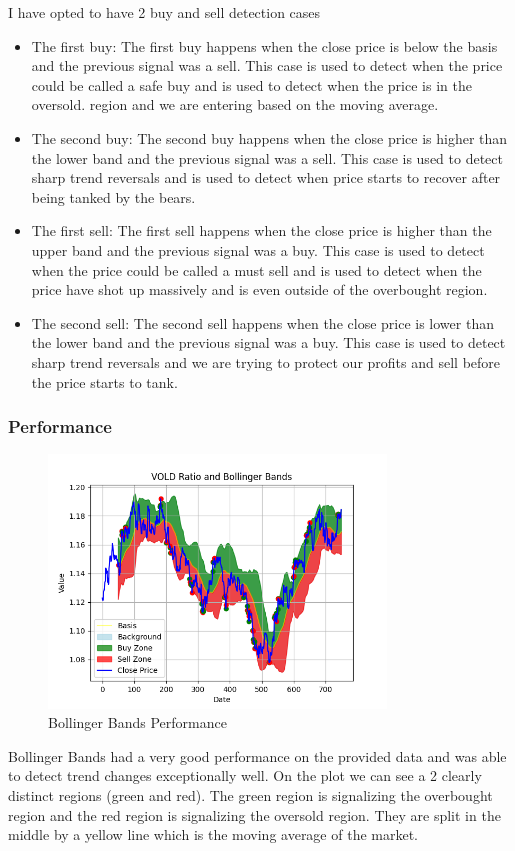 \documentclass{imc-inf}
\begin{document}
				I have opted to have 2 buy and sell detection cases
				\begin{itemize}
					\item The first buy: The first buy happens when the close price is below the basis and the previous signal was a sell.
						\subitem This case is used to detect when the price could be called a safe buy and is used to detect when the price is in the oversold.
						region and we are entering based on the moving average.
					\item The second buy: The second buy happens when the close price is higher than the lower band and the previous signal was a sell. 
						\subitem This case is used to detect sharp trend reversals and is used to detect when price starts to recover after being tanked by the bears. 
					\item The first sell: The first sell happens when the close price is higher than the upper band and the previous signal was a buy.
						\subitem This case is used to detect when the price could be called a must sell and is used to detect when the price have shot up massively and 
						is even outside of the overbought region.
					\item The second sell: The second sell happens when the close price is lower than the lower band and the previous signal was a buy.
						\subitem This case is used to detect sharp trend reversals and we are trying to protect our profits and sell before the price starts to tank.
				\end{itemize}

			\subsubsection{Performance}
				\begin{figure}[h!]
					\centering
					\includegraphics[width=0.8\textwidth]{bollinger_bands_plot.png}
					\caption{Bollinger Bands Performance}
					\label{fig:bollinger_bands_performance}
				\end{figure}
				Bollinger Bands had a very good performance on the provided data and was able to detect trend changes exceptionally well. 
				On the plot we can see a 2 clearly distinct regions (green and red). The green region is signalizing the overbought region and the red
				region is signalizing the oversold region.
				They are split in the middle by a yellow line which is the moving average of the market. 
				
\end{document}
